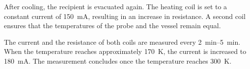 After cooling, the recipient is evacuated again. 
The heating coil is set to a constant current of \SI{150}{\milli\ampere}, 
resulting in an increase in resistance.
A second coil ensures that the temperatures of the probe and 
the vessel remain equal. 

The current and the resistance of both coils are measured every \SIrange{2}{5}{\minute}.
When the temperature reaches approximately \SI{170}{\kelvin}, the current
is increased to \SI{180}{\milli\ampere}.
The measurement concludes once the temperature reaches \SI{300}{\kelvin}.